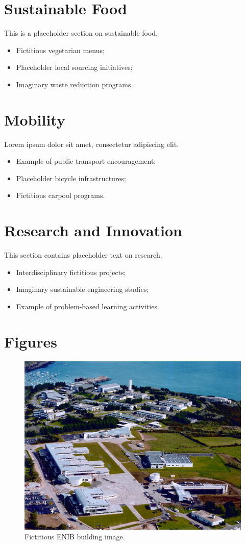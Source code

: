 \documentclass[12pt]{article}
\begin{document}
\section{Sustainable Food}
This is a placeholder section on sustainable food.  
\begin{itemize}
    \item Fictitious vegetarian menus;
    \item Placeholder local sourcing initiatives;
    \item Imaginary waste reduction programs.
\end{itemize}

\section{Mobility}
Lorem ipsum dolor sit amet, consectetur adipiscing elit.  
\begin{itemize}
    \item Example of public transport encouragement;
    \item Placeholder bicycle infrastructures;
    \item Fictitious carpool programs.
\end{itemize}

\section{Research and Innovation}
This section contains placeholder text on research.  
\begin{itemize}
    \item Interdisciplinary fictitious projects;
    \item Imaginary sustainable engineering studies;
    \item Example of problem-based learning activities.
\end{itemize}

\section{Figures}
\begin{figure}[h!]
    \centering
    \includegraphics[width=0.6\linewidth]{enib_building}
    \caption{Fictitious ENIB building image.}
\end{figure}
\end{document}
